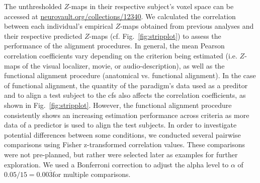 The unthresholded $Z$-maps in their respective subject's voxel space can be
accessed at
\href{https://identifiers.org/neurovault.collection:12340}{\url{neurovault.org/collections/12340}}.
%
We calculated the correlation between each individual's empirical $Z$-maps
obtained from previous analyses \citep{haeusler2022processing,
sengupta2016extension} and their respective predicted $Z$-maps (cf.
Fig.~\ref{fig:stripplot}) to assess the performance of the alignment procedures.
%
In general, the mean Pearson correlation coefficients vary depending on the
criterion being estimated (i.e. $Z$-maps of the visual localizer, movie, or
audio-description), as well as the functional alignment procedure (anatomical
vs. functional alignment).
%
In the case of functional alignment, the quantity of the paradigm's data used as
a preditor and to align a test subject to the \ac{cfs} also affects the
correlation coefficients, as shown in Fig.~\ref{fig:stripplot}.
%
However, the functional alignment procedure consistently shows an increasing
estimation performance across criteria as more data of a predictor is used to
align the test subjects.
%
In order to investigate potential differences between some conditions, we
conducted several pairwise comparisons using Fisher z-transformed correlation
values.
%
These comparisons were not pre-planned, but rather were selected later as
examples for further exploration.
%
We used a Bonferroni correction to adjust the alpha level to $\alpha$ of $0.05 /
15 = 0.00\overline{3}$for multiple comparisons.


